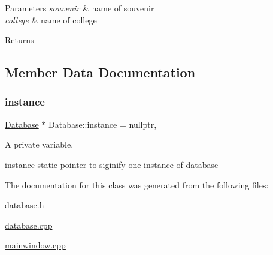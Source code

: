\begin{DoxyParams}{Parameters}
{\em souvenir} & name of souvenir \\
\hline
{\em college} & name of college \\
\hline
\end{DoxyParams}
\begin{DoxyReturn}{Returns}

\end{DoxyReturn}


\subsection{Member Data Documentation}
\mbox{\label{class_database_a5926460fe1c15c95d470fcde637f8d22}} 
\subsubsection{\texorpdfstring{instance}{instance}}
{\footnotesize\ttfamily \hyperlink{class_database}{Database} $\ast$ Database\+::instance = nullptr\hspace{0.3cm}{\ttfamily [static]}, {\ttfamily [private]}}



A private variable. 

instance static pointer to siginify one instance of database 

The documentation for this class was generated from the following files\+:\begin{DoxyCompactItemize}
\item 
\hyperlink{database_8h}{database.\+h}\item 
\hyperlink{database_8cpp}{database.\+cpp}\item 
\hyperlink{mainwindow_8cpp}{mainwindow.\+cpp}\end{DoxyCompactItemize}
